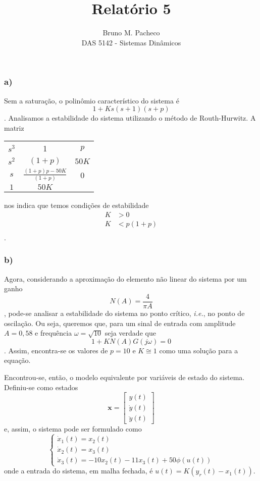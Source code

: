 \documentclass[a4paper]{report}
\begin{document}
\title{Relatório 5}
\author{Bruno M. Pacheco\\
DAS 5142 - Sistemas Dinâmicos}
 
\maketitle
 

\subsubsection*{a)}

Sem a saturação, o polinômio característico do sistema é \[
    1 + Ks(s+1)(s+p)
\]. Analisamos a estabilidade do sistema utilizando o método de Routh-Hurwitz. A matriz
\begin{center}
\begin{tabular}{c | c | c}
    $s^{3}$ & 1 & $p$ \\
    $s^{2}$ & $(1+p)$ & $50K$ \\
    $s$ & $\frac{(1+p)p-50K}{(1+p)}$ & 0 \\
    $1$ & $50K$ & 
\end{tabular}
\end{center}
nos indica que temos condições de estabilidade
\begin{align*}
    K&>0 \\
    K&<p(1+p) \\
\end{align*}
.

\subsubsection*{b)}

Agora, considerando a aproximação do elemento não linear do sistema por um ganho \[
    N(A) = \frac{4}{\pi A}
\], pode-se analisar a estabilidade do sistema no ponto crítico, \emph{i.e.}, no ponto de oscilação. Ou seja, queremos que, para um sinal de entrada com amplitude $A = 0,58$ e frequência $\omega = \sqrt{10}$ seja verdade que \[
1 + KN(A)G(j\omega) = 0
\]. Assim, encontra-se os valores de $p=10$ e $K\cong1$ como uma solução para a equação.

Encontrou-se, então, o modelo equivalente por variáveis de estado do sistema. Definiu-se como estados \[
\bm{x} = \begin{bmatrix} y(t) \\ \dot{y}(t) \\ \ddot{y}(t) \end{bmatrix} 
\] e, assim, o sistema pode ser formulado como \[
\begin{cases}
    \dot{x}_1(t) = x_2(t) \\
    \dot{x}_2(t) = x_3(t) \\
    \dot{x}_3(t) = -10x_2(t) -11x_3(t) + 50\phi\left( u(t) \right) 
\end{cases}
\] onde a entrada do sistema, em malha fechada, é $u(t) = K(y_r(t)-x_1(t))$.
\end{document}
